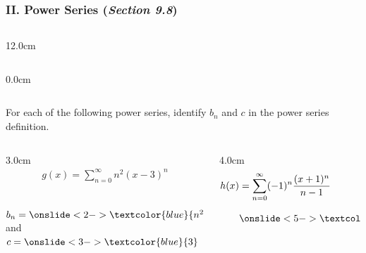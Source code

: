 \begin{frame}
\frametitle{II. Power Series {\normalsize({\em Section 9.8})}}
\scriptsize
\vspace{0.1cm}
\begin{columns}
\begin{column}{12.0cm}
	\begin{columns}\begin{column}{0.0cm}\end{column}\end{columns}
	
	\vspace{0.5cm}
	
For each of the following power series, identify $b_{n}$ and $c$ in the power series definition. \\

\vspace{0.1cm}

\begin{columns}
\begin{column}{3.0cm}
	\begin{align*}
		g(x) = \sum \limits_{n=0}^{\infty} n^2 (x-3)^n \\
		\\
		\\
	\end{align*}

	$b_{n} = \onslide<2->{\textcolor{blue}{n^2}}$ \quad and \quad $c = \onslide<3->{\textcolor{blue}{3}}$

	\vspace{1.2cm}
	
\end{column}
\begin{column}{4.0cm}
	\begin{align*}
	h(x) &= \sum \limits_{n=0}^{\infty} (-1)^n \frac{(x+1)^n}{n-1} \\
	&\onslide<5->{\textcolor{blue}{\,= \sum \limits_{n=0}^{\infty} \frac{(-1)^n}{n-1}\left(x-(-1)\right)^n}}
	\end{align*}


\end{column}
\end{columns}
\end{column}
\end{columns}
\end{frame}
